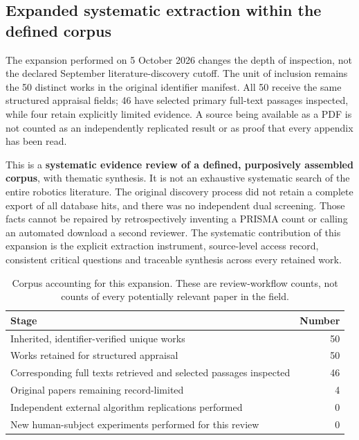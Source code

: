 \subsection{Expanded systematic extraction within the defined corpus}
\label{sec:systematic-extraction}
The expansion performed on 5 October 2026 changes the depth of inspection, not
the declared September literature-discovery cutoff. The unit of inclusion remains
the 50 distinct works in the original identifier manifest. All 50 receive the
same structured appraisal fields; 46 have selected primary full-text passages
inspected, while four retain explicitly limited evidence. A source being available
as a PDF is not counted as an independently replicated result or as proof that
every appendix has been read.

This is a \textbf{systematic evidence review of a defined, purposively assembled
corpus}, with thematic synthesis. It is not an exhaustive systematic search of
the entire robotics literature. The original discovery process did not retain a
complete export of all database hits, and there was no independent dual screening.
Those facts cannot be repaired by retrospectively inventing a PRISMA count or
calling an automated download a second reviewer. The systematic contribution of
this expansion is the explicit extraction instrument, source-level access record,
consistent critical questions and traceable synthesis across every retained work.

\begin{table}[htbp]
\centering\small
\caption{Corpus accounting for this expansion. These are review-workflow counts,
not counts of every potentially relevant paper in the field.}
\begin{tabularx}{\textwidth}{Y r}
\toprule Stage & Number \\ \midrule
Inherited, identifier-verified unique works & 50 \\
Works retained for structured appraisal & 50 \\
Corresponding full texts retrieved and selected passages inspected & 46 \\
Original papers remaining record-limited & 4 \\
Independent external algorithm replications performed & 0 \\
New human-subject experiments performed for this review & 0 \\
\bottomrule
\end{tabularx}
\end{table}

